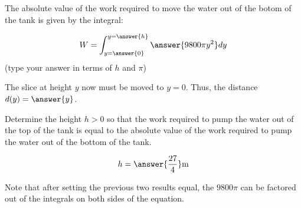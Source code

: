 \documentclass{ximera}
\begin{document}
\begin{exercise}
\begin{exercise}
The absolute value of the work required to move the water out of the botom of the tank is given by the integral:

\[
W=\int_{y=\answer{0}}^{y=\answer{h}} \answer{9800\pi y^2} dy  
\]
(type your answer in terms of $h$ and  $\pi$)

\begin{hint}
The slice at height $y$ now must be moved to $y=0$.  Thus, the distance $d(y) = \answer{y}$.
\end{hint}

\begin{exercise}

Determine the height $h>0$ so that the work required to pump the water out of the top of the tank is equal to the absolute value of the work required to pump the water out of the bottom of the tank.

\[
h=\answer{\frac{27}{4}} \text{m}
\]

\begin{hint}
Note that after setting the previous two results equal, the $9800 \pi$ can be factored out of the integrals on both sides of the equation.
\end{hint}

\end{exercise}
\end{exercise}
\end{exercise}
\end{document}
